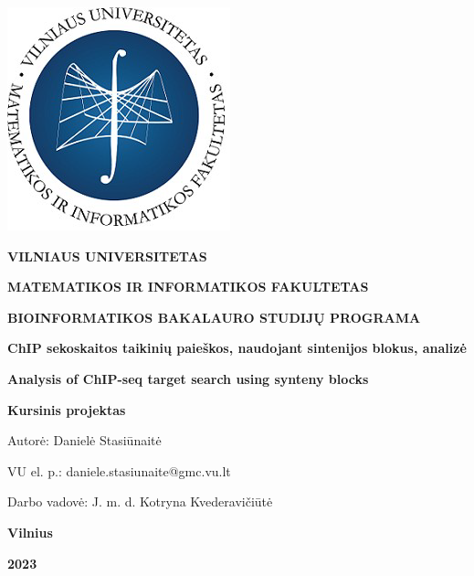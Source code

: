 \documentclass[12pt]{article}
\begin{document}

\begin{titlepage}
\vskip 20pt
\begin{center}
\includegraphics[scale=0.5]{MIF}
\end{center}


\vskip 20pt
\centerline{\bf \large \textbf{VILNIAUS UNIVERSITETAS}}
\bigskip
\centerline{\large \textbf{MATEMATIKOS IR INFORMATIKOS FAKULTETAS}}
\bigskip
\centerline{\large \textbf{BIOINFORMATIKOS BAKALAURO STUDIJŲ PROGRAMA}}

\vskip 90pt
\begin{center}
    {\bf \LARGE ChIP sekoskaitos taikinių paieškos, naudojant sintenijos
     blokus, analizė}
\end{center}
\begin{center}
    {\bf \Large Analysis of ChIP-seq target search using synteny blocks}
\end{center}
\vskip 20pt
\centerline{\bf \large \textbf{Kursinis projektas}}
\bigskip
\vskip 40pt

\hskip 140pt {\large Autorė: Danielė Stasiūnaitė}

\hskip 140pt{\large VU el. p.: daniele.stasiunaite@gmc.vu.lt}
\bigskip
\vskip 20pt

\hskip 140pt {\large Darbo vadovė: J. m. d. Kotryna Kvederavičiūtė}
\vskip 60pt
\vskip 40pt
\centerline{\large \textbf{Vilnius}}
\centerline{\large \textbf{2023}}
\newpage
\end{titlepage}



\tableofcontents
\newpage

\end{document}
